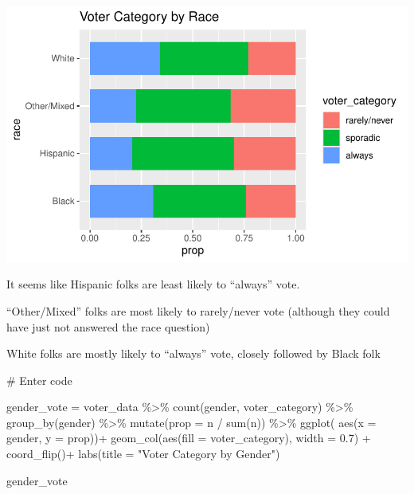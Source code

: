 \documentclass[
  letterpaper,
  DIV=11,
  numbers=noendperiod]{scrartcl}
\newenvironment{Shaded}{\begin{snugshade}}{\end{snugshade}}
\newcommand{\AttributeTok}[1]{\textcolor[rgb]{0.40,0.45,0.13}{#1}}
\newcommand{\CommentTok}[1]{\textcolor[rgb]{0.37,0.37,0.37}{#1}}
\newcommand{\FloatTok}[1]{\textcolor[rgb]{0.68,0.00,0.00}{#1}}
\newcommand{\FunctionTok}[1]{\textcolor[rgb]{0.28,0.35,0.67}{#1}}
\newcommand{\NormalTok}[1]{\textcolor[rgb]{0.00,0.23,0.31}{#1}}
\newcommand{\OtherTok}[1]{\textcolor[rgb]{0.00,0.23,0.31}{#1}}
\newcommand{\SpecialCharTok}[1]{\textcolor[rgb]{0.37,0.37,0.37}{#1}}
\newcommand{\StringTok}[1]{\textcolor[rgb]{0.13,0.47,0.30}{#1}}
\begin{document}
\includegraphics{Lab4_multinom_Questions-1_files/figure-pdf/unnamed-chunk-6-1.pdf}

It seems like Hispanic folks are least likely to ``always'' vote.

``Other/Mixed'' folks are most likely to rarely/never vote (although
they could have just not answered the race question)

White folks are mostly likely to ``always'' vote, closely followed by
Black folk

\begin{Shaded}
\begin{Highlighting}[]
\CommentTok{\# Enter code}

\NormalTok{gender\_vote }\OtherTok{=}\NormalTok{ voter\_data }\SpecialCharTok{\%\textgreater{}\%}
  \FunctionTok{count}\NormalTok{(gender, voter\_category) }\SpecialCharTok{\%\textgreater{}\%}
  \FunctionTok{group\_by}\NormalTok{(gender) }\SpecialCharTok{\%\textgreater{}\%}
  \FunctionTok{mutate}\NormalTok{(}\AttributeTok{prop =}\NormalTok{ n }\SpecialCharTok{/} \FunctionTok{sum}\NormalTok{(n)) }\SpecialCharTok{\%\textgreater{}\%}
  \FunctionTok{ggplot}\NormalTok{( }\FunctionTok{aes}\NormalTok{(}\AttributeTok{x =}\NormalTok{ gender, }\AttributeTok{y =}\NormalTok{ prop))}\SpecialCharTok{+}
  \FunctionTok{geom\_col}\NormalTok{(}\FunctionTok{aes}\NormalTok{(}\AttributeTok{fill =}\NormalTok{ voter\_category), }\AttributeTok{width =} \FloatTok{0.7}\NormalTok{) }\SpecialCharTok{+} \FunctionTok{coord\_flip}\NormalTok{()}\SpecialCharTok{+}
  \FunctionTok{labs}\NormalTok{(}\AttributeTok{title =} \StringTok{"Voter Category by Gender"}\NormalTok{)}

\NormalTok{gender\_vote}
\end{Highlighting}
\end{Shaded}
\end{document}
